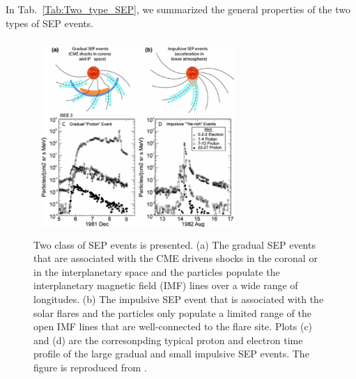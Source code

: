In Tab.~\ref{Tab:Two_type_SEP}, we summarized the general properties of the two types of \ac{SEP} events.

\begin{figure}
	\centering
	\includegraphics[width = 0.75\textwidth]{images/SEP_two_type.png}
	\caption[Two type of Solar energetic particle (SEP) event]{Two class of SEP events is presented. (a) The gradual SEP events that are associated with the CME drivens shocks in the coronal or in the interplanetary space and the particles populate the interplanetary magnetic field (IMF) lines over a wide range of longitudes. (b) The impulsive SEP event that is associated with the solar flares and the particles only populate a limited range of the open IMF lines that are well-connected to the flare site. Plots (c) and (d) are the corresonpding typical proton and electron time profile of the large gradual and small impulsive SEP events. The figure is reproduced from \citet{Desai_Diacalone2016LRSP}.}
	\label{Fig:two_type_SEP}
\end{figure}


